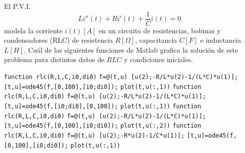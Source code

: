 \begin{pregunta}
\begin{cuerpo}
El P.V.I.
$$
Li''(t)+Ri'(t)+\frac{1}{C}i(t)=0
$$
modela la corriente $i(t)[A]$ en un circuito de resistencias, bobinas y condensadores (RLC) de resistencia $R[\Omega]$, capacitancia $C[F]$ e inductancia $L[H]$. Cu\'al de las siguientes funciones de Matlab grafica la soluci\'on de este problema para distintos datos de $RLC$ y condiciones iniciales.
\end{cuerpo}

\begin{multicols}{2}
\begin{alternativas}
{
\texttt{function rlc(R,L,C,i0,di0)}
\texttt{f=@(t,u) [u(2);-R/L*u(2)-1/(L*C)*u(1)];}
\texttt{[t,u]=ode45(f,[0,100],[i0;di0]);}
\texttt{plot(t,u(:,1))}		}
{
\texttt{function rlc(R,L,C,i0,di0)}
\texttt{f=@(t,u) [u(2);-R/L*u(2)-1/(L*C)*u(1)];}
\texttt{[t,u]=ode45(f,[i0;di0],[0,100]);}
\texttt{plot(t,u(:,1))}		}
{
\texttt{function rlc(R,L,C,i0,di0)}
\texttt{f=@(t,u) [u(2);-R/L*u(2)-1/(L*C)*u(1)];}
\texttt{[t,u]=ode45(f,[0,100],[i0;di0]);}
\texttt{plot(t,u(:,2))}		}
{
\texttt{function rlc(R,L,C,i0,di0)}
\texttt{f=@(t,u) [u(2);-R*u(2)-1/C*u(1)];}
\texttt{[t,u]=ode45(f,[0,100],[i0;di0]);}
\texttt{plot(t,u(:,1))}		}
\end{alternativas}
\end{multicols}
\justificacion{5cm}
\end{pregunta}